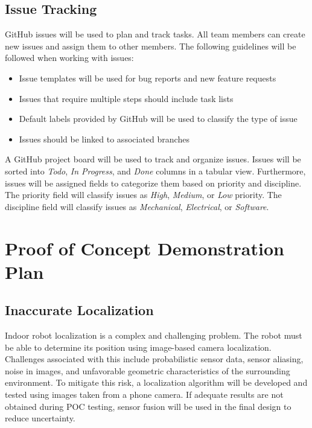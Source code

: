 \documentclass[titlepage]{article}
\begin{document}
\subsection{Issue Tracking}

GitHub issues will be used to plan and track tasks. All team members can create new issues and assign them to other members. The following guidelines will be followed when working with issues:

\begin{itemize}
\item Issue templates will be used for bug reports and new feature requests
\item Issues that require multiple steps should include task lists
\item Default labels provided by GitHub will be used to classify the type of issue
\item Issues should be linked to associated branches
\end{itemize}

A GitHub project board will be used to track and organize issues. Issues will be sorted into \textit{Todo}, \textit{In Progress}, and \textit{Done} columns in a tabular view. Furthermore, issues will be assigned fields to categorize them based on priority and discipline. The priority field will classify issues as \textit{High}, \textit{Medium}, or \textit{Low} priority. The discipline field will classify issues as \textit{Mechanical}, \textit{Electrical}, or \textit{Software}.

\section{Proof of Concept Demonstration Plan}

\subsection{Inaccurate Localization}
Indoor robot localization is a complex and challenging problem. The robot must be able to determine its position using image-based camera localization. Challenges associated with this include probabilistic sensor data, sensor aliasing, noise in images, and unfavorable geometric characteristics of the surrounding environment. To mitigate this risk, a localization algorithm will be developed and tested using images taken from a phone camera. If adequate results are not obtained during POC testing, sensor fusion will be used in the final design to reduce uncertainty.
\end{document}
